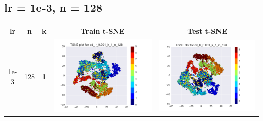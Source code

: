 \documentclass[12pt]{report}
\begin{document}
\subsection{lr = 1e-3, n = 128}
\begin{table}[H]
  \centering
  \begin{tabular}{ | c | c | c | c || c |}
    \hline
    \textbf{lr} & \textbf{n} & \textbf{k} & \textbf{Train t-SNE} & \textbf{Test t-SNE}\\ \hline
    1e-3 & 128 & 1 &
    \begin{minipage}{.3\textwidth}
      \includegraphics[scale=0.25]{cd_lr_0_001_k_1_n_128.png}
    \end{minipage} &
    \begin{minipage}{.3\textwidth}
      \includegraphics[scale=0.25]{test_cd_lr_0_001_k_1_n_128.png}

\end{minipage}
\end{tabular}
\end{table}
\end{document}
